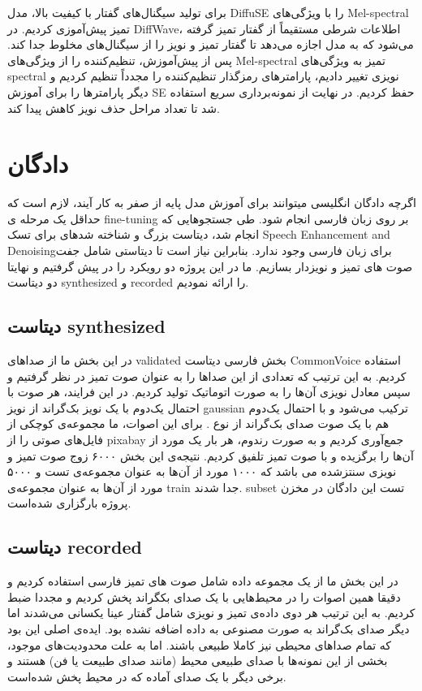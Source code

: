 \documentclass[fleqn]{report}
\begin{document}
برای تولید سیگنال‌های گفتار با کیفیت بالا، مدل DiffuSE را با ویژگی‌های Mel-spectral تمیز پیش‌آموزی کردیم. در DiffWave، اطلاعات شرطی مستقیماً از گفتار تمیز گرفته می‌شود که به مدل اجازه می‌دهد تا گفتار تمیز و نویز را از سیگنال‌های مخلوط جدا کند. پس از پیش‌آموزش، تنظیم‌کننده را از ویژگی‌های Mel-spectral تمیز به ویژگی‌های spectral نویزی تغییر دادیم، پارامترهای رمزگذار تنظیم‌کننده را مجدداً تنظیم کردیم و دیگر پارامترها را برای آموزش SE حفظ کردیم. در نهایت از نمونه‌برداری سریع استفاده شد تا تعداد مراحل حذف نویز کاهش پیدا کند.

\chapter{دادگان}
اگرچه دادگان انگلیسی میتوانند برای آموزش مدل پایه از صفر به کار آیند، لازم است که حداقل یک مرحله ی 
fine-tuning بر روی زبان فارسی انجام شود. طی جستجوهایی که انجام شد، دیتاست بزرگ و شناخته شدهای برای تسک  
 Speech Enhancement and Denoisingبرای زبان فارسی وجود ندارد. بنابراین نیاز است
  تا دیتاستی شامل جفت صوت های تمیز و نویزدار بسازیم. 
  ما در این پروژه دو رویکرد را در پیش گرفتیم و 
  نهایتا دو دیتاست synthesized و recorded را ارائه نمودیم.

\section{دیتاست synthesized}
در این بخش ما از صداهای validated بخش فارسی دیتاست CommonVoice استفاده کردیم.
به این ترتیب که تعدادی از این صداها را به عنوان صوت تمیز در نظر گرفتیم و سپس معادل نویزی آن‌ها را به صورت اتوماتیک تولید کردیم.
در این فرایند، هر صوت با احتمال یک‌دوم با یک نویز بک‌گراند از نویز gaussian ترکیب می‌شود و با 
احتمال یک‌دوم هم با یک صوت صدای بک‌گراند از نوع .
برای این اصوات، ما مجموعه‌ی کوچکی از فایل‌های صوتی  را از pixabay جمع‌آوری کردیم و به صورت رندوم، هر بار یک مورد از آن‌ها را برگزیده و با صوت تمیز تلفیق کردیم.
نتیجه‌ی این بخش ۶۰۰۰ زوج صوت تمیز و نویزی سنتزشده می باشد که ۱۰۰۰ مورد از آن‌ها به عنوان مجموعه‌ی تست و ۵۰۰۰ مورد از آن‌ها به عنوان مجموعه‌ی train جدا شدند.
subset تست این دادگان در مخزن پروژه بارگزاری شده‌است.

\section{دیتاست recorded}  
در این بخش ما
 از یک مجموعه داده شامل صوت های تمیز فارسی استفاده کردیم 
و دقیقا همین اصوات را در محیط‌هایی با یک صدای بکگراند پخش کردیم و مجددا ضبط کردیم.
به این ترتیب هر دوی داده‌ی تمیز و نویزی شامل گفتار عینا یکسانی می‌شدند اما دیگر صدای بک‌گراند به صورت مصنوعی به داده اضافه نشده بود.
ایده‌ی اصلی این بود که تمام صدا‌های محیطی نیز کاملا طبیعی باشند. اما به علت محدودیت‌های موجود، بخشی از این نمونه‌ها با صدای طبیعی محیط (مانند صدای طبیعت یا فن) هستند و برخی دیگر با یک صدای آماده که در محیط پخش شده‌است.
\end{document}
